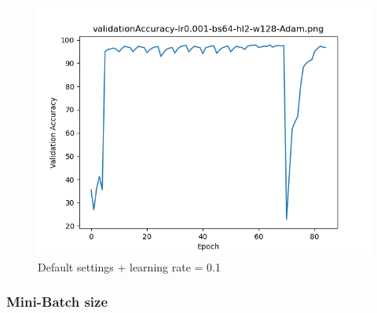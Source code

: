\documentclass{article}[12pt]
\begin{document}
        \begin{figure}[H]
        \includegraphics[width=\linewidth]{testsResults/validationAccuracy/def.png}
        \caption{Default settings + learning rate = 0.1}
        \endminipage
    \end{figure}

\subsubsection{Mini-Batch size}
\end{document}
